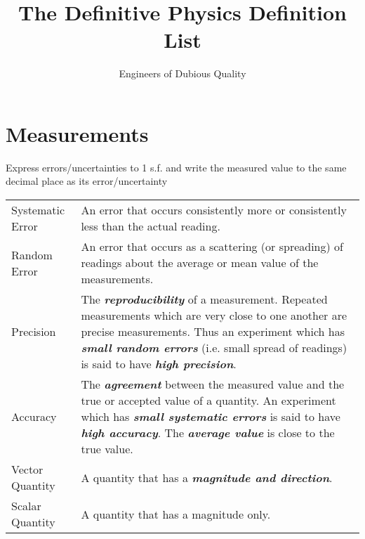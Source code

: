 \documentclass[a4paper]{article}
\title{The Definitive Physics Definition List}
\author{Engineers of Dubious Quality}
\begin{document}
	
	\maketitle
	
	\section{Measurements}
	Express errors/uncertainties to 1 s.f. and write the measured value to the same decimal place as its error/uncertainty
	
	\begin{center}
		\renewcommand{\arraystretch}{1.2}
		\begin{tabular}{@{} l p{10.5cm} @{}}
			\toprule
			Systematic Error & An error that occurs consistently more or consistently less than the actual reading.\\
			Random Error & An error that occurs as a scattering (or spreading) of readings about the average or mean value of the measurements. \\
			\midrule
			Precision & The \textit{\textbf{reproducibility}} of a measurement. Repeated measurements which are very close to one another are precise measurements. Thus an experiment which has \textit{\textbf{small random errors}} (i.e. small spread of readings) is said to have \textit{\textbf{high precision}}. \\
			Accuracy & The \textbf{\textit{agreement}} between the measured value and the true or accepted value of a quantity. An experiment which has \textbf{\textit{small systematic errors}} is said to have \textbf{\textit{high accuracy}}. The \textbf{\textit{average value}} is close to the true value. \\
			\midrule
			Vector Quantity & A quantity that has a \textbf{\textit{magnitude and direction}}. \\
			Scalar Quantity & A quantity that has a magnitude only. \\
			\bottomrule
		\end{tabular}
	\end{center}
	
\end{document}
